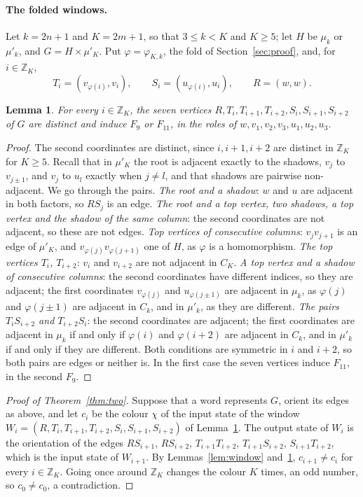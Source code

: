 \documentclass[11pt]{article}
\newtheorem{lemma}{Lemma}[section]
\theoremstyle{remark}
\newcommand{\Z}{\mathbb Z}
\begin{document}
\paragraph{The folded windows.}
Let $k=2n+1$ and $K=2m+1$, so that $3\le k<K$ and $K\ge5$; let $H$ be $\mu_k$ or
$\mu'_k$, and $G=H\times\mu'_K$. Put $\varphi=\varphi_{K,k}$, the fold of
Section~\ref{sec:proof}, and, for $i\in\Z_K$,
\[
T_i=(v_{\varphi(i)},v_i),\qquad S_i=(u_{\varphi(i)},u_i),\qquad R=(w,w).
\]

\begin{lemma}\label{lem:foldwin}
For every $i\in\Z_K$, the seven vertices $R,T_i,T_{i+1},T_{i+2},S_i,S_{i+1},
S_{i+2}$ of $G$ are distinct and induce $F_9$ or $F_{11}$, in the roles of
$w,v_1,v_2,v_3,u_1,u_2,u_3$.
\end{lemma}
\begin{proof}
The second coordinates are distinct, since $i,i+1,i+2$ are distinct in
$\Z_K$ for $K\ge5$. Recall that in $\mu'_K$ the root is adjacent exactly to
the shadows, $v_j$ to $v_{j\pm1}$, and $v_j$ to $u_l$ exactly when $j\ne l$,
and that shadows are pairwise non-adjacent. We go through the pairs.
\emph{The root and a shadow}: $w$ and $u$ are adjacent in both factors, so
$RS_j$ is an edge. \emph{The root and a top vertex, two shadows, a top vertex and
the shadow of the same column}: the second coordinates are not adjacent, so
these are not edges. \emph{Top vertices of consecutive columns}: $v_jv_{j+1}$ is
an edge of $\mu'_K$, and $v_{\varphi(j)}v_{\varphi(j+1)}$ one of $H$, as
$\varphi$ is a homomorphism. \emph{The top vertices $T_i$, $T_{i+2}$}: $v_i$ and
$v_{i+2}$ are not adjacent in $C_K$. \emph{A top vertex and a shadow of
consecutive columns}: the second coordinates have different indices, so they
are adjacent; the first coordinates $v_{\varphi(j)}$ and $u_{\varphi(j\pm1)}$
are adjacent in $\mu_k$, as $\varphi(j)$ and $\varphi(j\pm1)$ are adjacent in
$C_k$, and in $\mu'_k$, as they are different. \emph{The pairs $T_iS_{i+2}$
and $T_{i+2}S_i$}: the second coordinates are adjacent; the first coordinates
are adjacent in $\mu_k$ if and only if $\varphi(i)$ and $\varphi(i+2)$ are
adjacent in $C_k$, and in $\mu'_k$ if and only if they are different. Both
conditions are symmetric in $i$ and $i+2$, so both pairs are edges or neither
is. In the first case the seven vertices induce $F_{11}$, in the second $F_9$.
\end{proof}

\begin{proof}[Proof of Theorem~\ref{thm:two}]
Suppose that a word represents $G$, orient its edges as above, and let $c_i$
be the colour $\chi$ of the input state of the window $W_i=(R,T_i,T_{i+1},
T_{i+2},S_i,S_{i+1},S_{i+2})$ of Lemma~\ref{lem:foldwin}. The output state of
$W_i$ is the orientation of the edges $RS_{i+1}$, $RS_{i+2}$, $T_{i+1}T_{i+2}$,
$T_{i+1}S_{i+2}$, $S_{i+1}T_{i+2}$, which is the input state of $W_{i+1}$. By
Lemmas~\ref{lem:window} and~\ref{lem:foldwin}, $c_{i+1}\ne c_i$ for every
$i\in\Z_K$. Going once around $\Z_K$ changes the colour $K$ times, an odd
number, so $c_0\ne c_0$, a contradiction.
\end{proof}
\end{document}
